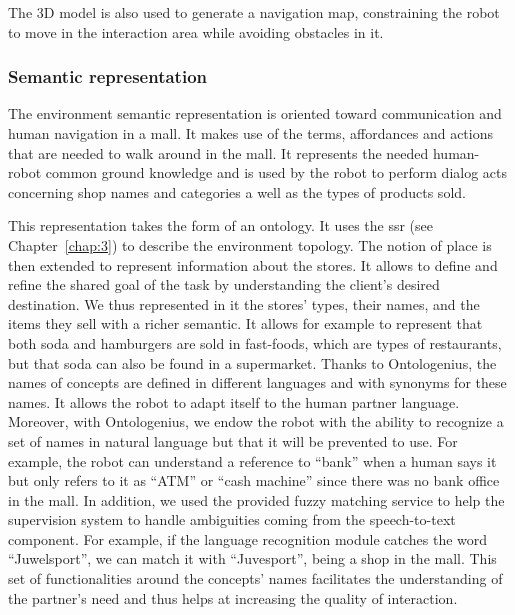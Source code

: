 The 3D model is also used to generate a navigation map, constraining the robot to move in the interaction area while avoiding obstacles in it.

\subsubsection{Semantic representation}

The environment semantic representation is oriented toward communication and human navigation in a mall. It makes use of the terms, affordances and actions that are needed to walk around in the mall. It represents the needed human-robot common ground knowledge and is used by the robot to perform dialog acts concerning shop names and categories a well as the types of products sold.

This representation takes the form of an ontology. It uses the \acrfull{ssr} (see Chapter~\ref{chap:3}) to describe the environment topology. The notion of place is then extended to represent information about the stores. It allows to define and refine the shared goal of the task by understanding the client's desired destination. We thus represented in it the stores' types, their names, and the items they sell with a richer semantic. It allows for example to represent that both soda and hamburgers are sold in fast-foods, which are types of restaurants, but that soda can also be found in a supermarket. Thanks to Ontologenius, the names of concepts are defined in different languages and with synonyms for these names. It allows the robot to adapt itself to the human partner language. Moreover, with Ontologenius, we endow the robot with the ability to recognize a set of names in natural language but that it will be prevented to use. For example, the robot can understand a reference to ``bank'' when a human says it but only refers to it as ``ATM'' or ``cash machine'' since there was no bank office in the mall. In addition, we used the provided fuzzy matching service to help the supervision system to handle ambiguities coming from the speech-to-text component. For example, if the language recognition module catches the word ``Juwelsport'', we can match it with ``Juvesport'', being a shop in the mall. This set of functionalities around the concepts' names facilitates the understanding of the partner's need and thus helps at increasing the quality of interaction.

